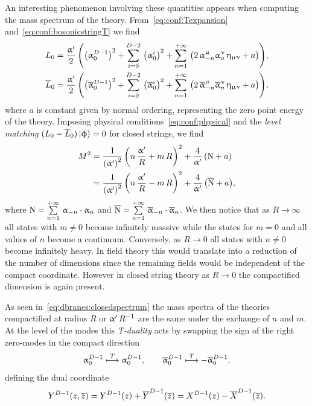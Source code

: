 An interesting phenomenon involving these quantities appears when computing the mass spectrum of the theory.
From~\eqref{eq:conf:Texpansion} and~\eqref{eq:conf:bosonicstringT} we find
\begin{equation}
  \begin{split}
    L_0
    &=
    \frac{\upalpha'}{2}\,
    \qty(
      \qty( \upalpha_0^{D-1} )^2
      +
      \sum\limits_{i = 0}^{D-2}\, \qty( \upalpha_0^i )^2
      +
      \sum\limits_{n = 1}^{+\infty}\, \qty( 2\, \upalpha_{-n}^{\upmu} \upalpha_n^{\upnu}\, \upeta_{\upmu\upnu} + a )
    ),
    \\
    \overline{L}_0
    &=
    \frac{\upalpha'}{2}\,
    \qty(
      \qty( \overline{\upalpha}_0^{D-1} )^2
      +
      \sum\limits_{i = 0}^{D-2}\, \qty( \overline{\upalpha}_0^i )^2
      +
      \sum\limits_{n = 1}^{+\infty}\, \qty( 2\, \overline{\upalpha}_{-n}^{\upmu} \overline{\upalpha}_n^{\upnu}\, \upeta_{\upmu\upnu} + a )
    ),
  \end{split}
\end{equation}
where $a$ is constant given by normal ordering, representing the zero point energy of the theory.
Imposing physical conditions~\eqref{eq:conf:physical} and the \emph{level matching} $(L_0 - \overline{L}_0) \ket{\upphi} = 0$ for closed strings, we find
\begin{equation}
  \begin{split}
    M^2
    & =
    \frac{1}{\qty(\upalpha')^2}\, \qty( n\, \frac{\upalpha'}{R} + m\, R )^2
    +
    \frac{4}{\upalpha'}\, \qty( \mathrm{N} + a )
    \\
    & =
    \frac{1}{\qty(\upalpha')^2}\, \qty( n\, \frac{\upalpha'}{R} - m\, R )^2
    +
    \frac{4}{\upalpha'}\, \qty( \overline{\mathrm{N}} + a ),
  \end{split}
  \label{eq:dbranes:closedspectrum}
\end{equation}
where $\mathrm{N} = \sum\limits_{n = 1}^{+\infty}\, \upalpha_{-n} \cdot \upalpha_n$ and $\overline{\mathrm{N}} = \sum\limits_{n = 1}^{+\infty}\, \overline{\upalpha}_{-n} \cdot \overline{\upalpha}_n$.
We then notice that as $R \to \infty$ all states with $m \neq 0$ become infinitely massive while the states for $m = 0$ and all values of $n$ become a continuum.
Conversely, as $R \to 0$ all states with $n \neq 0$ become infinitely heavy.
In field theory this would translate into a reduction of the number of dimensions since the remaining fields would be independent of the compact coordinate.
However in closed string theory as $R \to 0$ the compactified dimension is again present.

As seen in~\eqref{eq:dbranes:closedspectrum} the mass spectra of the theories compactified at radius $R$ or $\upalpha'\, R^{-1}$ are the same under the exchange of $n$ and $m$.
At the level of the modes this \emph{T-duality} acts by swapping the sign of the right zero-modes in the compact direction
\begin{equation}
  \upalpha_0^{D-1} \stackrel{T}{\longmapsto} \upalpha_0^{D-1},
  \qquad
  \overline{\upalpha}_0^{D-1} \stackrel{T}{\longmapsto} - \overline{\upalpha}_0^{D-1},
\end{equation}
defining the dual coordinate
\begin{equation}
  Y^{D-1}( z, \overline{z} ) = Y^{D-1}( z ) + \overline{Y}^{D-1}( \overline{z} ) =  X^{D-1}( z ) - \overline{X}^{D-1}( \overline{z} ).
  \label{eq:tduality:compactdirection}
\end{equation}



